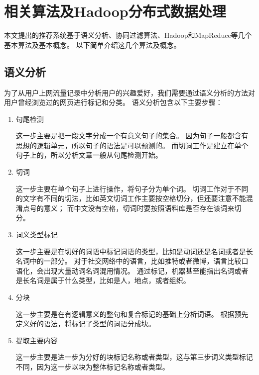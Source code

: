 \chapter{相关算法及Hadoop分布式数据处理}
本文提出的推荐系统基于语义分析、协同过滤算法、Hadoop和MapReduce等几个基本算法及基本概念。
以下简单介绍这几个算法及概念。

\section{语义分析}
为了从用户上网流量记录中分析用户的兴趣爱好，我们需要通过语义分析的方法对用户曾经浏览过的网页进行标记和分类。
语义分析包含以下主要步骤：
\begin{enumerate}
	\item 句尾检测

	这一步主要是把一段文字分成一个有意义句子的集合\parencite{kiss2006unsupervised}。
	因为句子一般都含有思想的逻辑单元，所以句子的语法是可以预测的。
	而切词工作是建立在单个句子上的，所以分析文章一般从句尾检测开始。
	
	\item 切词
	
	这一步主要在单个句子上进行操作，将句子分为单个词。
	切词工作对于不同的文字有不同的切法，比如英文切词工作主要按空格切分，但还要注意不能混淆点号的意义；
	而中文没有空格，切词时要按照语料库是否存在该词来切分。

	\item 词义类型标记

	这一步主要是在切好的词语中标记词语的类型，比如是动词还是名词或者是长名词中的一部分。
	对于社交网络中的语言，比如推特或者微博，语言比较口语化，会出现大量动词名词混用情况\parencite{Gimpel2011Part,Owoputi2015Improved,Derczynski2013Twitter}。
	通过标记，机器甚至能指出名词或者是长名词是属于什么类型，比如是人，地点，或者组织。
	
	\item 分块
	
	这一步主要是在有逻辑意义的整句和复合标记的基础上分析词语。
	根据预先定义好的语法，将标记了类型的词语分成块。

	\item 提取主要内容

	这一步主要是进一步为分好的块标记名称或者类型，这与第三步词义类型标记不同，因为这一步以块为整体标记名称或者类型。
\end{enumerate}


